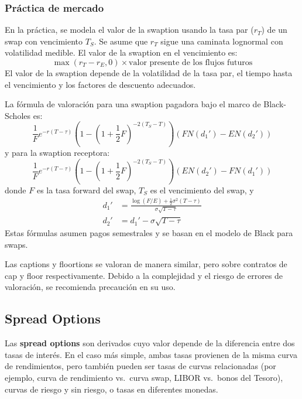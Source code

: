 \subsubsection*{Práctica de mercado}

En la práctica, se modela el valor de la swaption usando la tasa par ($r_T$) de un swap con vencimiento $T_S$. Se asume que $r_T$ sigue una caminata lognormal con volatilidad medible. El valor de la swaption en el vencimiento es:
\begin{equation*}
    \max(r_T - r_E, 0) \times \text{valor presente de los flujos futuros}
\end{equation*}
El valor de la swaption depende de la volatilidad de la tasa par, el tiempo hasta el vencimiento y los factores de descuento adecuados.

La fórmula de valoración para una swaption pagadora bajo el marco de Black-Scholes es:
\begin{equation*}
    \frac{1}{F} e^{-r(T-\tau)} \left( 1 - \left(1 + \frac{1}{2}F\right)^{-2(T_S-T)} \right) \left( FN(d_1') - EN(d_2') \right)
\end{equation*}
y para la swaption receptora:
\begin{equation*}
    \frac{1}{F} e^{-r(T-\tau)} \left( 1 - \left(1 + \frac{1}{2}F\right)^{-2(T_S-T)} \right) \left( EN(d_2') - FN(d_1') \right)
\end{equation*}
donde $F$ es la tasa forward del swap, $T_S$ es el vencimiento del swap, y
\begin{align*}
    d_1' &= \frac{\log(F/E) + \frac{1}{2}\sigma^2(T-\tau)}{\sigma\sqrt{T-\tau}} \\
    d_2' &= d_1' - \sigma\sqrt{T-\tau}
\end{align*}
Estas fórmulas asumen pagos semestrales y se basan en el modelo de Black para swaps.

Las captions y floortions se valoran de manera similar, pero sobre contratos de cap y floor respectivamente. Debido a la complejidad y el riesgo de errores de valoración, se recomienda precaución en su uso.



\subsection{Spread Options}

Las \textbf{spread options} son derivados cuyo valor depende de la diferencia entre dos tasas de interés. En el caso más simple, ambas tasas provienen de la misma curva de rendimientos, pero también pueden ser tasas de curvas relacionadas (por ejemplo, curva de rendimiento vs.\ curva swap, LIBOR vs.\ bonos del Tesoro), curvas de riesgo y sin riesgo, o tasas en diferentes monedas.

